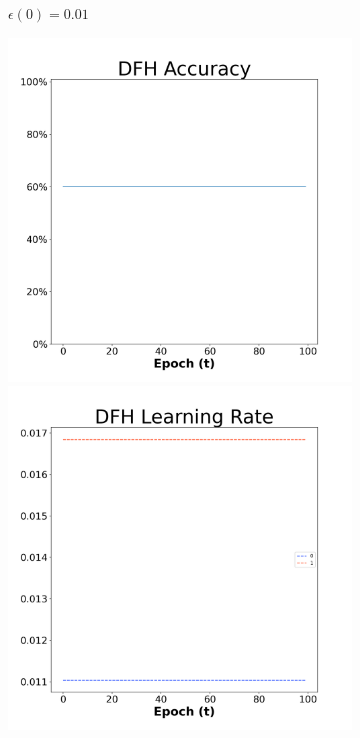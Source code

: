 \begin{figure}[H]
\begin{subfigure}{0.3\textwidth}
  \caption{$\epsilon(0)=0.01$}
\end{subfigure}\hfil %
\begin{subfigure}{0.3\textwidth}
  \includegraphics[width=\linewidth]{images/exper1/NSP/DFH_0.03_acc.png}
  \includegraphics[width=\linewidth]{images/exper1/NSP/DFH_0.03_lr.png}

\end{subfigure}
\end{figure}
